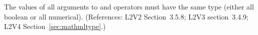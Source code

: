 The values of all arguments to  and  operators must
have the same type (either all boolean or all numerical).
(References: L2V2 Section~3.5.8; L2V3 section~3.4.9; L2V4
Section~\ref{sec:mathmltype}.)
